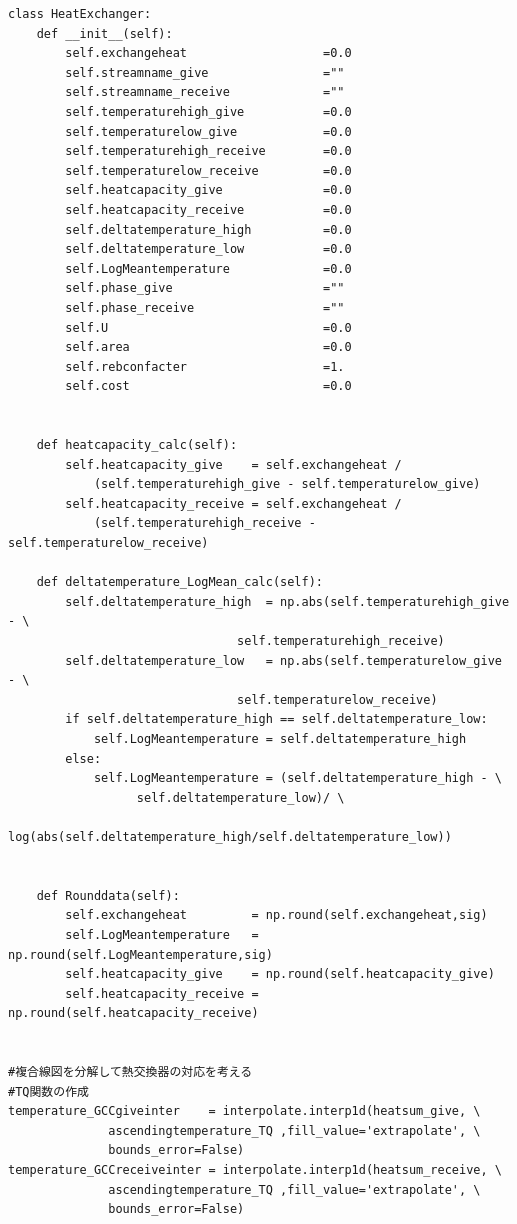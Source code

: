 \documentclass[a4j]{jsreport}
\begin{document}
\begin{lstlisting}[caption=グランドコンポジットカーブおよびTQ線図を書くコード]
class HeatExchanger:
    def __init__(self):
        self.exchangeheat                   =0.0
        self.streamname_give                =""
        self.streamname_receive             =""
        self.temperaturehigh_give           =0.0
        self.temperaturelow_give            =0.0
        self.temperaturehigh_receive        =0.0
        self.temperaturelow_receive         =0.0
        self.heatcapacity_give              =0.0
        self.heatcapacity_receive           =0.0
        self.deltatemperature_high          =0.0
        self.deltatemperature_low           =0.0
        self.LogMeantemperature             =0.0
        self.phase_give                     =""
        self.phase_receive                  =""
        self.U                              =0.0
        self.area                           =0.0
        self.rebconfacter                   =1.
        self.cost                           =0.0


    def heatcapacity_calc(self):
        self.heatcapacity_give    = self.exchangeheat /
            (self.temperaturehigh_give - self.temperaturelow_give)
        self.heatcapacity_receive = self.exchangeheat /
            (self.temperaturehigh_receive - self.temperaturelow_receive)

    def deltatemperature_LogMean_calc(self):
        self.deltatemperature_high  = np.abs(self.temperaturehigh_give - \
                                self.temperaturehigh_receive)
        self.deltatemperature_low   = np.abs(self.temperaturelow_give  - \
                                self.temperaturelow_receive)
        if self.deltatemperature_high == self.deltatemperature_low:
            self.LogMeantemperature = self.deltatemperature_high
        else:
            self.LogMeantemperature = (self.deltatemperature_high - \
                  self.deltatemperature_low)/ \
                  log(abs(self.deltatemperature_high/self.deltatemperature_low))


    def Rounddata(self):
        self.exchangeheat         = np.round(self.exchangeheat,sig)
        self.LogMeantemperature   = np.round(self.LogMeantemperature,sig)
        self.heatcapacity_give    = np.round(self.heatcapacity_give)
        self.heatcapacity_receive = np.round(self.heatcapacity_receive)


#複合線図を分解して熱交換器の対応を考える
#TQ関数の作成
temperature_GCCgiveinter    = interpolate.interp1d(heatsum_give, \
              ascendingtemperature_TQ ,fill_value='extrapolate', \
              bounds_error=False)
temperature_GCCreceiveinter = interpolate.interp1d(heatsum_receive, \
              ascendingtemperature_TQ ,fill_value='extrapolate', \
              bounds_error=False)


\end{lstlisting}
\end{document}
